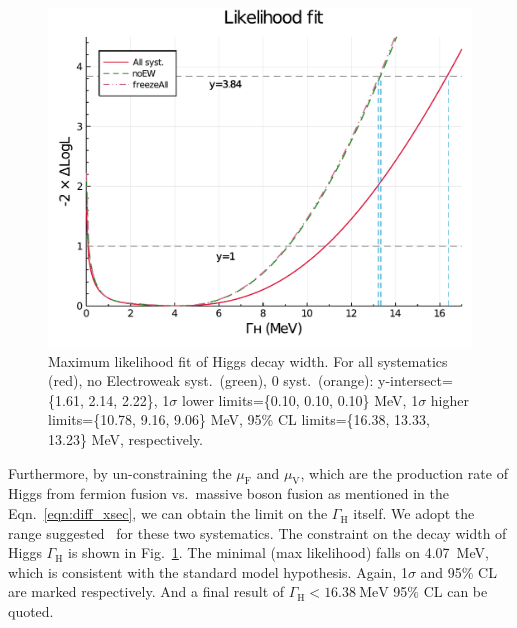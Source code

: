\begin{figure}[h]
    \centering
    \includegraphics[width=.8\linewidth]{fig/Final_fit_width.pdf}
    \caption{Maximum likelihood fit of Higgs decay width. For all systematics (red), no Electroweak syst.~(green),
    0 syst.~(orange): y-intersect=\{1.61, 2.14, 2.22\}, 1$\sigma$ lower limits=\{0.10, 0.10, 0.10\} MeV,
1$\sigma$ higher limits=\{10.78, 9.16, 9.06\} MeV, 95\% CL limits=\{16.38, 13.33, 13.23\} MeV, respectively.}
\label{fig:final_fit_width}
\end{figure}
Furthermore, by un-constraining the $\mu_\mathrm{F}$ and $\mu_\mathrm{V}$, which are the production rate
of Higgs from fermion fusion vs.\ massive boson fusion as mentioned in the Eqn.~\ref{eqn:diff_xsec}, we can
obtain the limit on the $\Gamma_\mathrm{H}$ itself.
We adopt the range suggested~\cite{rfrv_higgs_pas} for these two systematics. The constraint on the decay width of Higgs $\Gamma_\mathrm{H}$ is shown in 
Fig.~\ref{fig:final_fit_width}. The minimal (max likelihood) falls on \SI{4.07}{\mega\electronvolt},
which is consistent with the standard model hypothesis.
Again, 1$\sigma$ and 95\% CL are marked respectively. And a final result of 
$\Gamma_\mathrm{H}<\SI{16.38}{\mega\electronvolt}$ 95\% CL can be quoted.


